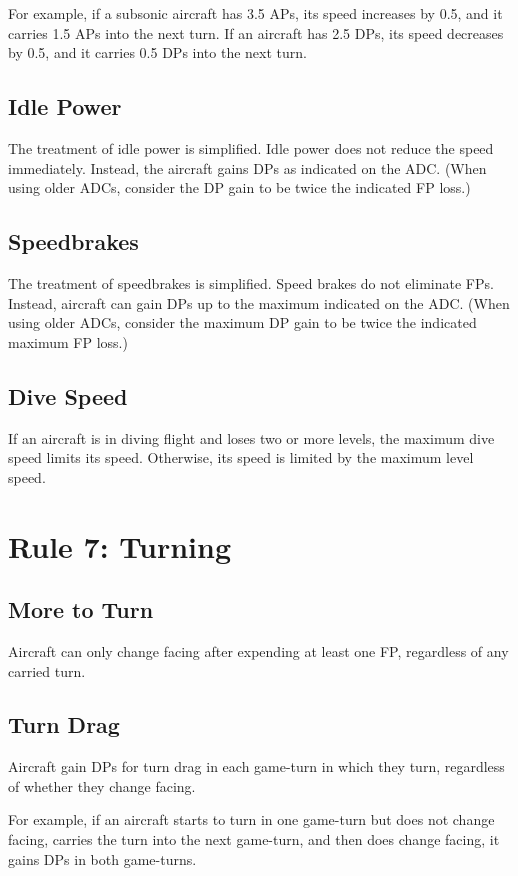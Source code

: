\documentclass[10pt]{extarticle}
\begin{document}
For example, if a subsonic aircraft has 3.5 APs, its speed increases by 0.5, and it carries 1.5 APs into the next turn. If an aircraft has 2.5 DPs, its speed decreases by 0.5, and it carries 0.5 DPs into the next turn.

\subsection{Idle Power} The treatment of idle power is simplified. Idle power does not reduce the speed immediately. Instead, the aircraft gains DPs as indicated on the ADC. (When using older ADCs, consider the DP gain to be twice the indicated FP loss.)

\subsection{Speedbrakes} The treatment of speedbrakes is simplified. Speed brakes do not eliminate FPs. Instead, aircraft can gain DPs up to the maximum indicated on the ADC. (When using older ADCs, consider the maximum DP gain to be twice the indicated maximum FP loss.)

\subsection{Dive Speed} If an aircraft is in diving flight and loses two or more levels, the maximum dive speed limits its speed. Otherwise, its speed is limited by the maximum level speed.

\section{Rule 7: Turning}

\subsection{More to Turn} Aircraft can only change facing after expending at least one FP, regardless of any carried turn.

\subsection{Turn Drag} Aircraft gain DPs for turn drag in each game-turn in which they turn, regardless of whether they change facing. 

For example, if an aircraft starts to turn in one game-turn but does not change facing, carries the turn into the next game-turn, and then does change facing, it gains DPs in both game-turns.
\end{document}
